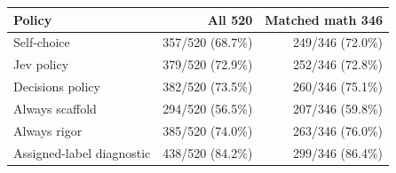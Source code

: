 \begin{tabular}{lrr}
\toprule
Policy & All 520 & Matched math 346 \\
\midrule
Self-choice & 357/520 (68.7\%) & 249/346 (72.0\%) \\
Jev policy & 379/520 (72.9\%) & 252/346 (72.8\%) \\
Decisions policy & 382/520 (73.5\%) & 260/346 (75.1\%) \\
Always scaffold & 294/520 (56.5\%) & 207/346 (59.8\%) \\
Always rigor & 385/520 (74.0\%) & 263/346 (76.0\%) \\
Assigned-label diagnostic & 438/520 (84.2\%) & 299/346 (86.4\%) \\
\bottomrule
\end{tabular}
